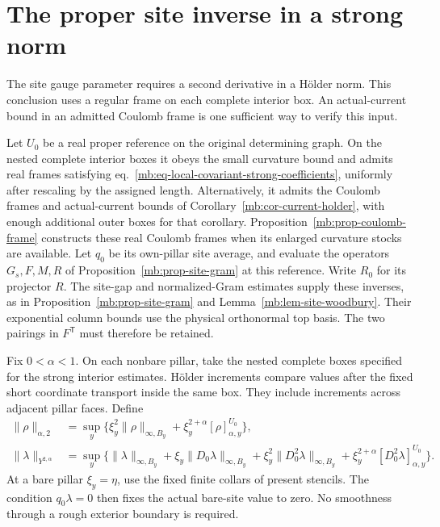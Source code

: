 \documentclass[11pt,letterpaper,reqno]{amsart}
\numberwithin{equation}{section}
\renewcommand{\eqref}[1]{\textup{eq.~\ref{#1}}}
\theoremstyle{definition}
\theoremstyle{remark}
\begin{document}
\section{The proper site inverse in a strong norm}\label{mb:proper-site}

The site gauge parameter requires a second derivative in a
H\"older norm. This conclusion uses a regular frame on each
complete interior box. An actual-current bound in an admitted
Coulomb frame is one sufficient way to verify this input.

Let $U_0$ be a real proper reference on the original determining
graph. On the nested complete interior boxes it obeys the small
curvature bound and admits real frames satisfying
\eqref{mb:eq-local-covariant-strong-coefficients}, uniformly after
rescaling by the assigned length. Alternatively, it admits the
Coulomb frames and actual-current bounds of
Corollary~\ref{mb:cor-current-holder}, with enough additional
outer boxes for that corollary. Proposition~\ref{mb:prop-coulomb-frame}
constructs these real Coulomb frames when its enlarged curvature
stocks are available. Let $q_0$ be its own-pillar site average,
and evaluate the operators $G_s,F,M,R$ of
Proposition~\ref{mb:prop-site-gram} at this reference.
Write $R_0$ for its projector $R$.
The site-gap and normalized-Gram estimates supply these
inverses, as in Proposition~\ref{mb:prop-site-gram} and
Lemma~\ref{mb:lem-site-woodbury}.
Their exponential column bounds use the physical
orthonormal top basis. The two pairings in $F^{\mathsf T}$ must
therefore be retained.

Fix $0<\alpha<1$. On each nonbare pillar, take the nested complete
boxes specified for the strong interior estimates. H\"older
increments compare values after the fixed short coordinate
transport inside the same box. They include increments across
adjacent pillar faces. Define
\begin{align}
 \|\rho\|_{\alpha,2}
   &=\sup_y\{\xi_y^2\|\rho\|_{\infty,B_y}
                    +\xi_y^{2+\alpha}[\rho]_{\alpha,y}^{U_0}\},
                \label{mb:site-source-norm}\\
 \|\lambda\|_{Y^{2,\alpha}}
   &=\sup_y\{\|\lambda\|_{\infty,B_y}
        +\xi_y\|D_0\lambda\|_{\infty,B_y}
        +\xi_y^2\|D_0^2\lambda\|_{\infty,B_y}
        +\xi_y^{2+\alpha}[D_0^2\lambda]_{\alpha,y}^{U_0}\}.
                \label{mb:site-solution-norm}
\end{align}
At a bare pillar $\xi_y=\eta$, use the fixed finite collars of
present stencils. The condition $q_0\lambda=0$ then fixes the
actual bare-site value to zero. No smoothness through a rough
exterior boundary is required.
\end{document}
